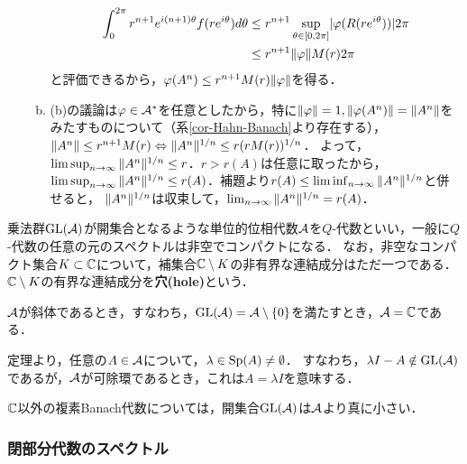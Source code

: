 \documentclass[uplatex,dvipdfmx]{jsreport}
\begin{document}
\begin{Proof}
\begin{enumerate}
\begin{enumerate}[(a)]
\begin{align*}
                \int^{2\pi}_0r^{n+1}e^{i(n+1)\theta}f(re^{i\theta})d\theta&\le r^{n+1}\sup_{\theta\in[0,2\pi]}\lvert\varphi(R(re^{i\theta}))\rvert2\pi\\
                &\le r^{n+1}\|\varphi\|M(r)2\pi
            \end{align*}
            と評価できるから，$\varphi(A^n)\le r^{n+1}M(r)\|\varphi\|$を得る．
            \item (b)の議論は$\varphi\in\mathcal{A}^*$を任意としたから，特に$\|\varphi\|=1,\|\varphi(A^n)\|=\|A^n\|$をみたすものについて（系\ref{cor-Hahn-Banach}より存在する），
            $\|A^n\|\le r^{n+1}M(r)\Leftrightarrow\|A^n\|^{1/n}\le r(rM(r))^{1/n}$．
            よって，$\limsup_{n\to\infty}\|A^n\|^{1/n}\le r$．$r>r(A)$は任意に取ったから，
            $\limsup_{n\to\infty}\|A^n\|^{1/n}\le r(A)$．補題より$r(A)\le\liminf_{n\to\infty}\|A^n\|^{1/n}$と併せると，
            $\|A^n\|^{1/n}$は収束して，$\lim_{n\to\infty}\|A^n\|^{1/n}=r(A)$．
        \end{enumerate}
    \end{enumerate}
\end{Proof}
\begin{remarks}
    乗法群$\mathrm{GL}(\mathcal{A})$が開集合となるような単位的位相代数$\mathcal{A}$を$Q$-代数といい，一般に$Q$-代数の任意の元のスペクトルは非空でコンパクトになる．
    なお，非空なコンパクト集合$K\subset\mathbb{C}$について，補集合$\mathbb{C}\setminus K$の非有界な連結成分はただ一つである．
    $\mathbb{C}\setminus K$の有界な連結成分を\textbf{穴(hole)}という．
\end{remarks}

\begin{corollary}\label{cor-Gelfand-Mazur-thm}
    $\mathcal{A}$が斜体であるとき，すなわち，$\mathrm{GL}(\mathcal{A})=\mathcal{A}\setminus\{0\}$を満たすとき，$\mathcal{A}=\mathbb{C}$である．
\end{corollary}
\begin{Proof}
    定理より，任意の$A\in\mathcal{A}$について，$\lambda\in\mathrm{Sp}(A)\ne\emptyset$．
    すなわち，$\lambda I-A\notin\mathrm{GL}(\mathcal{A})$であるが，$\mathcal{A}$が可除環であるとき，これは$A=\lambda I$を意味する．
\end{Proof}
\begin{remarks}
    $\mathbb{C}$以外の複素Banach代数については，開集合$\mathrm{GL}(\mathcal{A})$は$\mathcal{A}$より真に小さい．
\end{remarks}

\subsubsection{閉部分代数のスペクトル}
\end{document}
